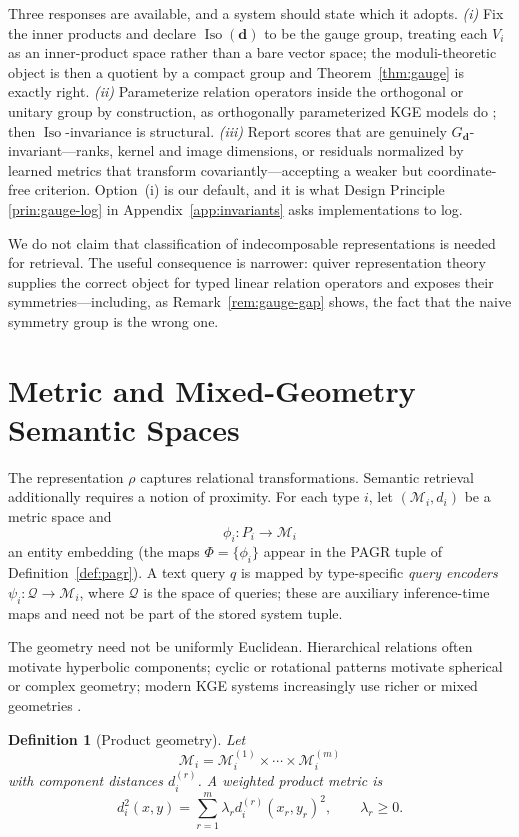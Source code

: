 \documentclass[11pt]{article}
\newtheorem{definition}{Definition}[section]
\newcommand{\Iso}{\operatorname{Iso}}
\newcommand{\M}{\mathcal{M}}
\begin{document}
Three responses are available, and a system should state which it adopts. \emph{(i)} Fix the inner products and declare $\Iso(\bm d)$ to be the gauge group, treating each $V_i$ as an inner-product space rather than a bare vector space; the moduli-theoretic object is then a quotient by a compact group and Theorem~\ref{thm:gauge} is exactly right. \emph{(ii)} Parameterize relation operators inside the orthogonal or unitary group by construction, as orthogonally parameterized KGE models do \citep{li2024golde}; then $\Iso$-invariance is structural. \emph{(iii)} Report scores that are genuinely $G_{\bm d}$-invariant---ranks, kernel and image dimensions, or residuals normalized by learned metrics that transform covariantly---accepting a weaker but coordinate-free criterion. Option~(i) is our default, and it is what Design Principle \ref{prin:gauge-log} in Appendix~\ref{app:invariants} asks implementations to log.

We do not claim that classification of indecomposable representations is needed for retrieval. The useful consequence is narrower: quiver representation theory supplies the correct object for typed linear relation operators and exposes their symmetries---including, as Remark~\ref{rem:gauge-gap} shows, the fact that the naive symmetry group is the wrong one.

\section{Metric and Mixed-Geometry Semantic Spaces}

The representation $\rho$ captures relational transformations. Semantic retrieval additionally requires a notion of proximity. For each type $i$, let $(\M_i,d_i)$ be a metric space and
\[
\phi_i:P_i\to \M_i
\]
an entity embedding (the maps $\Phi=\{\phi_i\}$ appear in the PAGR tuple of Definition~\ref{def:pagr}). A text query $q$ is mapped by type-specific \emph{query encoders} $\psi_i:\mathcal{Q}\to \M_i$, where $\mathcal{Q}$ is the space of queries; these are auxiliary inference-time maps and need not be part of the stored system tuple.

The geometry need not be uniformly Euclidean. Hierarchical relations often motivate hyperbolic components; cyclic or rotational patterns motivate spherical or complex geometry; modern KGE systems increasingly use richer or mixed geometries \citep{sun2019,li2024golde,yusupov2025}.

\begin{definition}[Product geometry]
Let
\[
\M_i=\M_i^{(1)}\times\cdots\times\M_i^{(m)}
\]
with component distances $d_i^{(r)}$. A weighted product metric is
\[
d_i^2(x,y)=\sum_{r=1}^{m}\lambda_r d_i^{(r)}(x_r,y_r)^2,
\qquad \lambda_r\ge 0.
\]
\end{definition}
\end{document}

